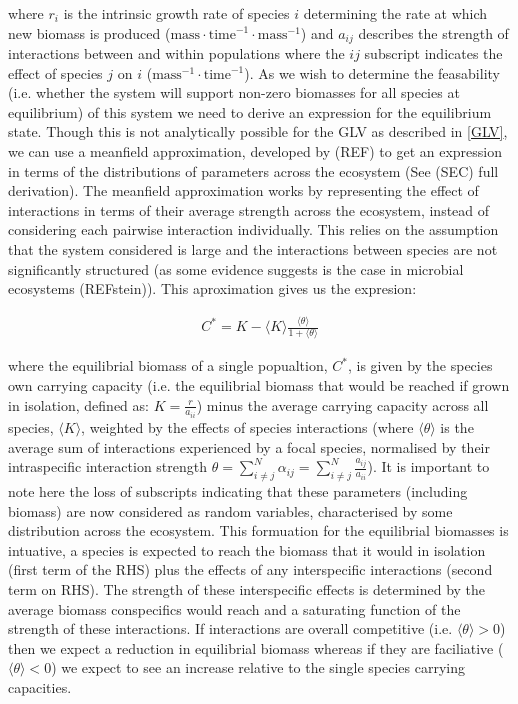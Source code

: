 \documentclass{article}
\begin{document}
where $r_i$ is the intrinsic growth rate of species $i$ determining the rate at which new biomass is produced ($\text{mass} \cdot \text{time}^{-1} \cdot \text{mass}^{-1} $) and $a_{ij}$ describes the strength of interactions between and within populations where the $ij$ subscript indicates the effect of species $j$ on $i$ ($\text{mass}^{-1} \cdot \text{time}^{-1}$). As we wish to determine the feasability (i.e. whether the system will support non-zero biomasses for all species at equilibrium) of this system we need to derive an expression for the equilibrium state. Though this is not analytically possible for the GLV as described in \cref{GLV}, we can use a meanfield approximation, developed by (REF) to get an expression in terms of the distributions of parameters across the ecosystem (See (SEC) full derivation). The meanfield approximation works by representing the effect of interactions in terms of their average strength across the ecosystem, instead of considering each pairwise interaction individually. This relies on the assumption that the system considered is large and the interactions between species are not significantly structured (as some evidence suggests is the case in microbial ecosystems (REFstein)). This aproximation gives us the expresion:

\begin{align}
  C^* = K - \langle K \rangle \frac{\langle \theta \rangle}{1 + \langle \theta \rangle} \label{MF_eqi}
\end{align}

where the equilibrial biomass of a single popualtion, $C^*$, is given by the species own carrying capacity (i.e. the equilibrial biomass that would be reached if grown in isolation, defined as: $K = \frac{r}{a_{ii}}$) minus the average carrying capacity across all species, $\langle K \rangle$, weighted by the effects of species interactions (where $\langle \theta \rangle$ is the average sum of interactions experienced by a focal species, normalised by their intraspecific interaction strength $\theta = \sum_{i \neq j}^{N} \alpha_{ij} = \sum_{i \neq j}^{N} \frac{a_{ij}}{a_{ii}}$). It is important to note here the loss of subscripts indicating that these parameters (including biomass) are now considered as random variables, characterised by some distribution across the ecosystem. This formuation for the equilibrial biomasses is intuative, a species is expected to reach the biomass that it would in isolation (first term of the RHS) plus the effects of any interspecific interactions (second term on RHS). The strength of these interspecific effects is determined by the average biomass conspecifics would reach and a saturating function of the strength of these interactions. If interactions are overall competitive (i.e. $\langle \theta \rangle > 0$) then we expect a reduction in equilibrial biomass whereas if they are faciliative ($\langle \theta \rangle < 0$) we expect to see an increase relative to the single species carrying capacities.
\end{document}
